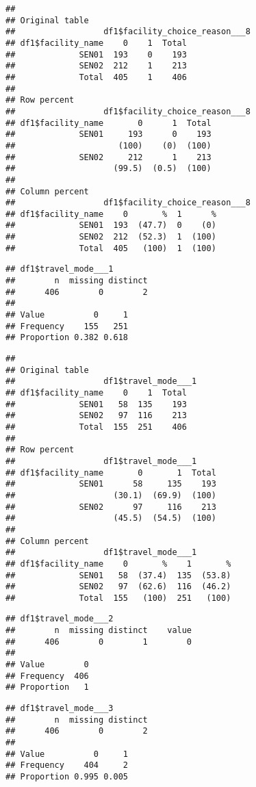 \documentclass[
]{article}
\begin{document}
\begin{verbatim}
## 
## Original table 
##                  df1$facility_choice_reason___8
## df1$facility_name    0    1  Total
##             SEN01  193    0    193
##             SEN02  212    1    213
##             Total  405    1    406
## 
## Row percent 
##                  df1$facility_choice_reason___8
## df1$facility_name       0      1  Total
##             SEN01     193      0    193
##                     (100)    (0)  (100)
##             SEN02     212      1    213
##                    (99.5)  (0.5)  (100)
## 
## Column percent 
##                  df1$facility_choice_reason___8
## df1$facility_name    0       %  1      %
##             SEN01  193  (47.7)  0    (0)
##             SEN02  212  (52.3)  1  (100)
##             Total  405   (100)  1  (100)
\end{verbatim}

\begin{verbatim}
## df1$travel_mode___1 
##        n  missing distinct 
##      406        0        2 
##                       
## Value          0     1
## Frequency    155   251
## Proportion 0.382 0.618
\end{verbatim}

\begin{verbatim}
## 
## Original table 
##                  df1$travel_mode___1
## df1$facility_name    0    1  Total
##             SEN01   58  135    193
##             SEN02   97  116    213
##             Total  155  251    406
## 
## Row percent 
##                  df1$travel_mode___1
## df1$facility_name       0       1  Total
##             SEN01      58     135    193
##                    (30.1)  (69.9)  (100)
##             SEN02      97     116    213
##                    (45.5)  (54.5)  (100)
## 
## Column percent 
##                  df1$travel_mode___1
## df1$facility_name    0       %    1       %
##             SEN01   58  (37.4)  135  (53.8)
##             SEN02   97  (62.6)  116  (46.2)
##             Total  155   (100)  251   (100)
\end{verbatim}

\begin{verbatim}
## df1$travel_mode___2 
##        n  missing distinct    value 
##      406        0        1        0 
##               
## Value        0
## Frequency  406
## Proportion   1
\end{verbatim}

\begin{verbatim}
## df1$travel_mode___3 
##        n  missing distinct 
##      406        0        2 
##                       
## Value          0     1
## Frequency    404     2
## Proportion 0.995 0.005
\end{verbatim}
\end{document}
